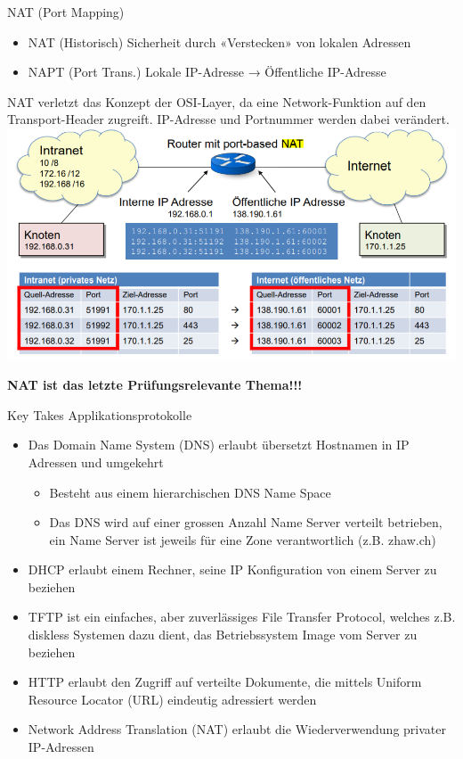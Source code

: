 \begin{definition}{NAT (Port Mapping)}
    \begin{itemize}
        \item NAT (Historisch) Sicherheit durch «Verstecken» von lokalen Adressen
        \item NAPT (Port Trans.) Lokale IP-Adresse → Öffentliche IP-Adresse
    \end{itemize}
    NAT verletzt das Konzept der OSI-Layer, da eine Network-Funktion auf den Transport-Header zugreift. IP-Adresse und Portnummer werden dabei verändert. \\
        \includegraphics[width=1\linewidth]{images/NAT.png}
\end{definition}

\textbf{NAT ist das letzte Prüfungsrelevante Thema!!!}

\begin{KR}{Key Takes Applikationsprotokolle}
    \begin{itemize}
        \item Das Domain Name System (DNS) erlaubt übersetzt Hostnamen in IP Adressen und umgekehrt
        \begin{itemize}
            \item Besteht aus einem hierarchischen DNS Name Space
            \item Das DNS wird auf einer grossen Anzahl Name Server verteilt betrieben, ein Name Server ist jeweils für eine Zone verantwortlich (z.B. zhaw.ch)
        \end{itemize}
        \item DHCP erlaubt einem Rechner, seine IP Konfiguration von einem Server zu beziehen
        \item TFTP ist ein einfaches, aber zuverlässiges File Transfer Protocol, welches z.B. diskless Systemen dazu dient, das Betriebssystem Image vom Server zu beziehen
        \item HTTP erlaubt den Zugriff auf verteilte Dokumente, die mittels Uniform Resource Locator (URL) eindeutig adressiert werden
        \item Network Address Translation (NAT) erlaubt die Wiederverwendung privater IP-Adressen
    \end{itemize}
\end{KR}

